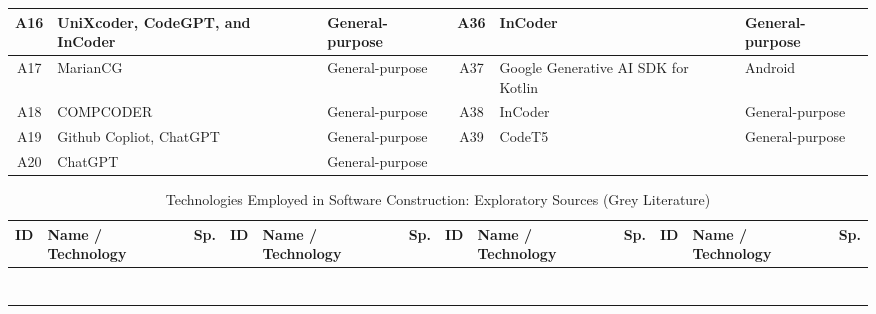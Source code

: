 \begin{table}[ht]
\begin{tabular}{|c|p{5cm}|p{2.5cm}||c|p{5cm}|p{2.5cm}|}
\hline
A16 & UniXcoder, CodeGPT, and InCoder & General-purpose & A36 & InCoder & General-purpose \\
\hline
A17 & MarianCG & General-purpose & A37 & Google Generative AI SDK for Kotlin & Android \\
\hline
A18 & COMPCODER & General-purpose & A38 & InCoder & General-purpose \\
\hline
A19 & Github Copliot, ChatGPT & General-purpose & A39 & CodeT5 & General-purpose \\
\hline
A20 & ChatGPT & General-purpose &  &  &  \\
\hline
\end{tabular}
\end{table}




\begin{table}[t]
\centering
\caption{Technologies Employed in Software Construction: Exploratory Sources (Grey Literature)}
\label{tab:results_grey}
\setlength{\tabcolsep}{3.5pt}        %
\renewcommand{\arraystretch}{1.05}    %
\scriptsize                           %
\begin{threeparttable}
\begin{tabularx}{\textwidth}{l Y c l Y c l Y c l Y c}
\toprule
ID & Name / Technology & Sp. & ID & Name / Technology & Sp. & ID & Name / Technology & Sp. & ID & Name / Technology & Sp.\\
\midrule
{} &  &  &  \\
 &  &  &  \\
 &  &  &  \\
 &  &  &  \\
 &  &  &  \\
 &  &  &  \\
 &  &  &  \\

\end{tabularx}
\end{threeparttable}
\end{table}
